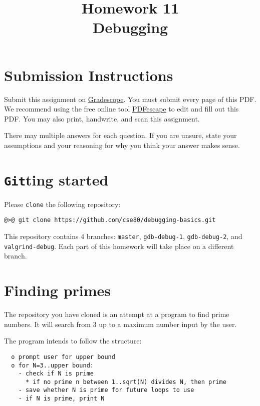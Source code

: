 \documentclass{article}
\begin{document}
\fancyfoot[C]{\color{gray} \thepage~/~\pageref*{LastPage}}
\pagestyle{fancyplain}



\title{\textbf{Homework 11\\Debugging}}
\author{\textbf{\color{red}{Due: Saturday, March 25, 10:00PM (Hard Deadline)}}}
\date{}
\maketitle


\section*{Submission Instructions}
Submit this assignment on \href{https://gradescope.com/courses/5574}{Gradescope}.
You must submit every page of this PDF.
We recommend using the free online tool \href{https://www.pdfescape.com}{PDFescape}
to edit and fill out this PDF.
You may also print, handwrite, and scan this assignment.

There may multiple answers for each question. If you are unsure,
state your assumptions and your reasoning for why you think your answer
makes sense.


\newpage
\section{\texttt{Git}ting started}

Please \texttt{clone} the following repository:

\begin{lstlisting}
@>@ git clone https://github.com/cse80/debugging-basics.git
\end{lstlisting}

This repository contains 4 branches: \texttt{master}, \texttt{gdb-debug-1}, \texttt{gdb-debug-2}, and \texttt{valgrind-debug}. Each part of this homework will take place on a different branch.

\section{Finding primes}

The repository you have cloned is an attempt at a program to find prime
numbers. It will search from 3 up to a maximum number input by the user.

The program intends to follow the structure:
\begin{lstlisting}
  o prompt user for upper bound
  o for N=3..upper bound:
    - check if N is prime
      * if no prime n between 1..sqrt(N) divides N, then prime
    - save whether N is prime for future loops to use
    - if N is prime, print N
\end{lstlisting}
\end{document}
